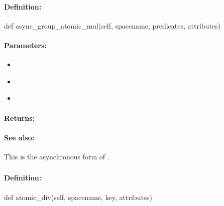 \paragraph{Definition:}
\begin{pythoncode}
def async_group_atomic_mul(self, spacename, predicates, attributes)
\end{pythoncode}

\paragraph{Parameters:}
\begin{itemize}[noitemsep]
\item {}\\

\item {}\\

\item {}\\

\end{itemize}

\paragraph{Returns:}


\paragraph{See also:}  This is the asynchronous form of .

\pagebreak
\subsubsection{}
\label{api:python:atomic_div}


\paragraph{Definition:}
\begin{pythoncode}
def atomic_div(self, spacename, key, attributes)
\end{pythoncode}

